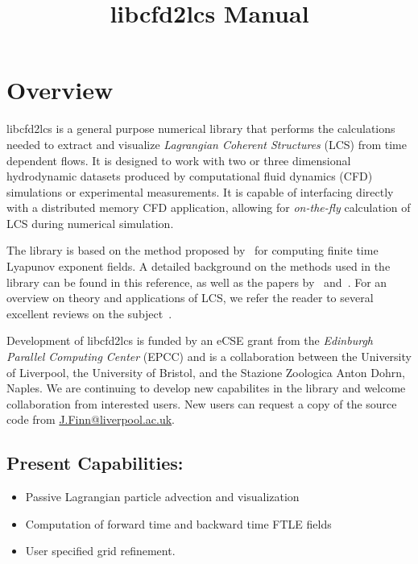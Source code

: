 \documentclass[letterpaper,12pt]{article}
\title{libcfd2lcs Manual}
\begin{document}
\maketitle
\section{Overview}
libcfd2lcs is a general purpose numerical library that performs the calculations needed to extract and visualize \emph{Lagrangian Coherent Structures} (LCS) from time dependent flows.  It is designed to work with two or three dimensional hydrodynamic datasets produced by computational fluid dynamics (CFD) simulations or experimental measurements.  It is capable of interfacing directly with a distributed memory CFD application, allowing for \emph{on-the-fly} calculation of LCS during numerical simulation.

The library is based on the method proposed by~\cite{finn2013integrated} for computing finite time Lyapunov exponent fields.  A detailed background on the methods used in the library can be found in this reference, as well as the papers by~\cite{brunton2010fast} and~\cite{leung2011eulerian}.  For an overview on theory and applications of LCS, we refer the reader to several excellent reviews on the subject~\cite{haller2015lagrangian,peacock2015introduction,peacock2010introduction,samelson2013lagrangian}.

Development of libcfd2lcs is funded by an eCSE grant from the \emph{Edinburgh Parallel Computing Center} (EPCC) and is a collaboration between the University of Liverpool, the University of Bristol, and the Stazione Zoologica Anton Dohrn, Naples.  We are continuing to develop new capabilites in the library and welcome collaboration from interested users.  New users can request a copy of the source code from \href{mailto:J.Finn@liverpool.ac.uk}{J.Finn@liverpool.ac.uk}.
 
\subsection*{Present Capabilities:}
 
\begin{itemize}
 \item Passive Lagrangian particle advection and visualization
 \item Computation of forward time and backward time FTLE fields
 \item User specified grid refinement.  
\end{itemize}
\end{document}

